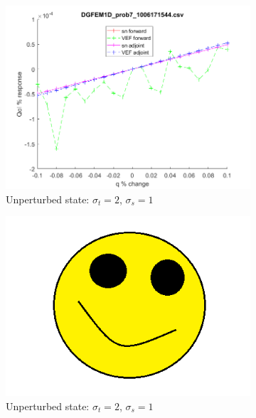 \documentclass[12pt]{report}
\newcommand{\sigt}{\sigma_t}
\newcommand{\sigs}{\sigma_s}
\begin{document}
\begin{figure}[H]
\label{InHomoPertq}
\centering
\begin{subfigure}{.5\textwidth}
  \centering
  \includegraphics[width=.98\linewidth]{figures/7qSens.png}
  \caption{Unperturbed state: $\sigt=2$, $\sigs=1$}
  \label{fig:sfig1}
\end{subfigure}%
\begin{subfigure}{.5\textwidth}
  \centering
  \includegraphics[width=.98\linewidth]{figures/holder.png}
  \caption{Unperturbed state: $\sigt=2$, $\sigs=1$}
  \label{fig:sfig4}
\end{subfigure}%
\\
\begin{subfigure}{.5\textwidth}
  \centering

\end{subfigure}
\end{figure}
\end{document}
